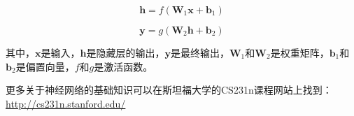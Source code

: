 \begin{equation}
    \mathbf{h} = f(\mathbf{W}_1\mathbf{x} + \mathbf{b}_1)
\end{equation}

\begin{equation}
    \mathbf{y} = g(\mathbf{W}_2\mathbf{h} + \mathbf{b}_2)
\end{equation}

其中，$\mathbf{x}$是输入，$\mathbf{h}$是隐藏层的输出，$\mathbf{y}$是最终输出，$\mathbf{W}_1$和$\mathbf{W}_2$是权重矩阵，$\mathbf{b}_1$和$\mathbf{b}_2$是偏置向量，$f$和$g$是激活函数。

更多关于神经网络的基础知识可以在斯坦福大学的CS231n课程网站上找到：\url{http://cs231n.stanford.edu/}
